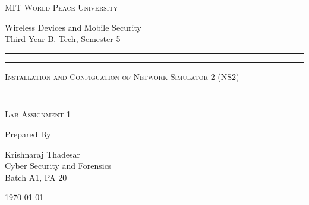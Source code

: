 \documentclass[11pt]{article}
\begin{document}
\begin{titlepage}
    \centering


    \huge\textsc{
        MIT World Peace University
    }\\

    \vspace{0.75\baselineskip} %

    \LARGE{
        Wireless Devices and Mobile Security\\
        Third Year B. Tech, Semester 5
    }

    \vfill %


    \rule{\textwidth}{1.6pt}\vspace*{-\baselineskip}\vspace*{2pt}
    \rule{\textwidth}{0.6pt}
    \vspace{0.75\baselineskip} %



    \huge{\textsc{
            Installation and Configuation of Network Simulator 2 (NS2)
        }} \\



    \vspace{0.5\baselineskip} %
    \rule{\textwidth}{0.6pt}\vspace*{-\baselineskip}\vspace*{2.8pt}
    \rule{\textwidth}{1.6pt}

    \vspace{1\baselineskip} %


    \LARGE\textsc{
        Lab Assignment 1
    } %
    \vfill


    Prepared By
    \vspace{0.5\baselineskip} %

    \Large{
        Krishnaraj Thadesar \\
        Cyber Security and Forensics\\
        Batch A1, PA 20
    }


    \vspace{0.5\baselineskip} %
    \today

\end{titlepage}
\end{document}
